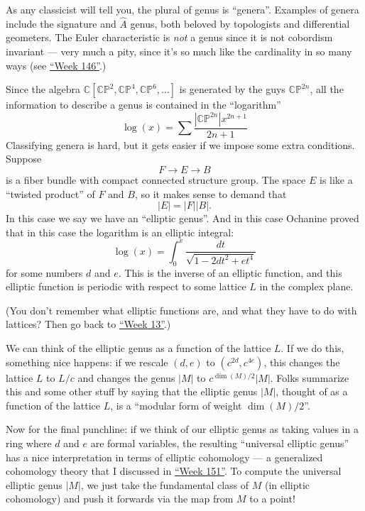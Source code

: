 \documentclass{article}
\begin{document}
As any classicist will tell you, the plural of genus is ``genera''.
Examples of genera include the signature and \(\hat{A}\) genus, both
beloved by topologists and differential geometers. The Euler
characteristic is \emph{not} a genus since it is not cobordism invariant
--- very much a pity, since it's so much like the cardinality in so many
ways (see \protect\hyperlink{week146}{``Week 146''}.)

Since the algebra
\(\mathbb{C}[\mathbb{CP}^2,\mathbb{CP}^4,\mathbb{CP}^6,\ldots]\) is
generated by the guys \(\mathbb{CP}^{2n}\), all the information to
describe a genus is contained in the ``logarithm''
\[\log(x) = \sum \frac{|\mathbb{CP}^{2n}|x^{2n+1}}{2n+1}\] Classifying
genera is hard, but it gets easier if we impose some extra conditions.
Suppose \[F \to E \to B\] is a fiber bundle with compact connected
structure group. The space \(E\) is like a ``twisted product'' of \(F\)
and \(B\), so it makes sense to demand that \[|E| = |F| |B|.\] In this
case we say we have an ``elliptic genus''. And in this case Ochanine
proved that in this case the logarithm is an elliptic integral:
\[\log(x) = \int_0^x \frac{dt}{\sqrt{1 - 2dt^2 + et^4}}\] for some
numbers \(d\) and \(e\). This is the inverse of an elliptic function,
and this elliptic function is periodic with respect to some lattice
\(L\) in the complex plane.

(You don't remember what elliptic functions are, and what they have to
do with lattices? Then go back to \protect\hyperlink{week13}{``Week
13''}.)

We can think of the elliptic genus as a function of the lattice \(L\).
If we do this, something nice happens: if we rescale \((d,e)\) to
\((c^{2d},c^{4e})\), this changes the lattice \(L\) to \(L/c\) and
changes the genus \(|M|\) to \(c^{\dim(M)/2} |M|\). Folks summarize this
and some other stuff by saying that the elliptic genus \(|M|\), thought
of as a function of the lattice \(L\), is a ``modular form of weight
\(\dim(M)/2\)''.

Now for the final punchline: if we think of our elliptic genus as taking
values in a ring where \(d\) and \(e\) are formal variables, the
resulting ``universal elliptic genus'' has a nice interpretation in
terms of elliptic cohomology --- a generalized cohomology theory that I
discussed in \protect\hyperlink{week151}{``Week 151''}. To compute the
universal elliptic genus \(|M|\), we just take the fundamental class of
\(M\) (in elliptic cohomology) and push it forwards via the map from
\(M\) to a point!
\end{document}
